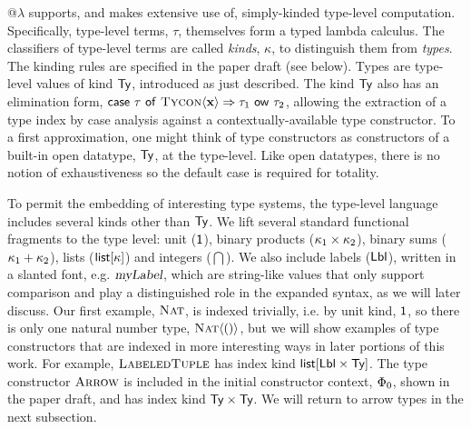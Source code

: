 @$\lambda$ supports, and makes extensive use of, simply-kinded type-level computation. Specifically, type-level terms, $\tau$, themselves form a typed lambda calculus. The classifiers of type-level terms are called \emph{kinds}, $\kappa$, to distinguish them from  \emph{types}. The kinding rules are specified in the paper draft (see below). Types are  type-level values of kind $\textsf{Ty}$, introduced as just described. The kind $\textsf{Ty}$ also has an elimination form, ${\sf case}~\tau~{\sf of}~\textsc{Tycon}\langle{\textbf{x}}\rangle\Rightarrow\tau_1~{\sf ow}~\tau_2$, allowing the extraction of a type index by case analysis against a contextually-available type constructor. To a first approximation, one might think of type constructors as constructors of a built-in open datatype, $\textsf{Ty}$, at the type-level. Like open datatypes, there is no notion of exhaustiveness so the default case is required for totality.


 To permit the embedding of interesting type systems, the type-level language includes several kinds other than $\textsf{Ty}$. We lift several  standard functional fragments to the type level: unit ($\textsf{1}$), binary products ($\kappa_1 \times \kappa_2$), binary sums ($\kappa_1 + \kappa_2$), lists ($\textsf{list}[\kappa]$) and integers ($\dint$). We also include labels ($\textsf{Lbl}$), written in a slanted font, e.g. $\textsl{myLabel}$, which are string-like values that only support comparison and play a distinguished role in the expanded syntax, as we will later discuss. Our first example, $\textsc{Nat}$, is indexed trivially, i.e. by unit kind, $\textsf{1}$, so there is only one natural number type, $\textsc{Nat}\langle()\rangle$, but we will show examples of type constructors that are indexed in more interesting ways in later portions of this work. For example, $\textsc{LabeledTuple}$ has index kind $\textsf{list}[\textsf{Lbl} \times \textsf{Ty}]$. The type constructor $\textsc{Arrow}$ is included in the initial constructor context, $\Phi_0$, shown in the paper draft, and has index kind $\textsf{Ty} \times \textsf{Ty}$. We will return to arrow types in the next subsection.
 
